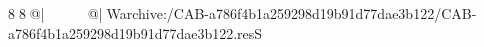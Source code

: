 8  8  @|                                                   @| W   archive:/CAB-a786f4b1a259298d19b91d77dae3b122/CAB-a786f4b1a259298d19b91d77dae3b122.resS 